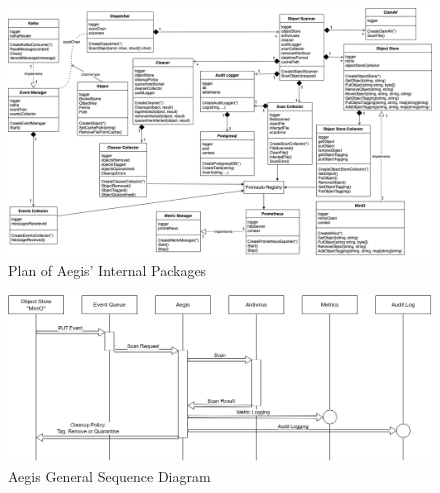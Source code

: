 \documentclass[12pt, conference, final, a4paper, onecolumn, compsoc]{IEEEtran}
\begin{document}
\begin{figure}[H]
  \centering \includegraphics[scale=.38]{diagrams/class-diagram.png}
  \caption{Plan of Aegis' Internal Packages}
  \label{appendix:class-diagram}
\end{figure}

\begin{figure}[H]
  \centering \includegraphics[scale=0.53]{diagrams/general-sequence.png}
  \caption{Aegis General Sequence Diagram}
  \label{appendix:general-sequence}
\end{figure}
\end{document}
